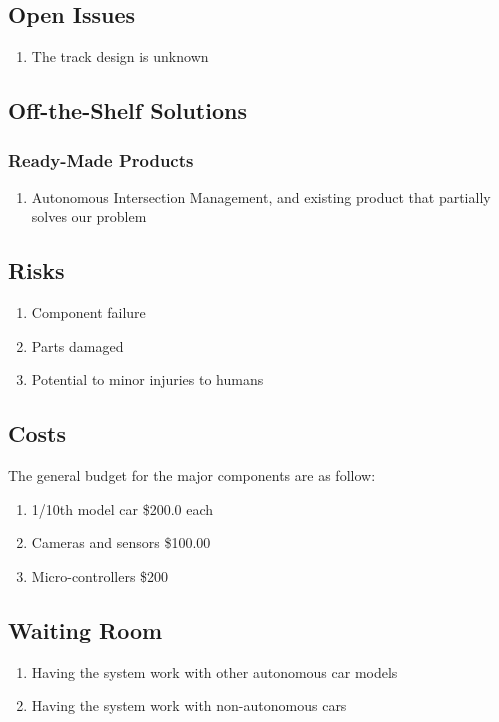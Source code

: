 \documentclass [12pt]{article}
\begin{document}
\subsection{Open Issues}
	\begin{enumerate}[label=\textbf{\Alph*}:]
		\item The track design is unknown
	\end{enumerate}

\subsection{Off-the-Shelf Solutions}

\subsubsection{Ready-Made Products}
	\begin{enumerate}[label=\textbf{\Alph*}:]
		\item Autonomous Intersection Management, and existing product that partially solves our problem
	\end{enumerate}


\subsection{Risks}
	\begin{enumerate}[label=\textbf{\Alph*}:]
		\item Component failure
		\item Parts damaged
		\item Potential to minor injuries to humans
	\end{enumerate}
	
\subsection{Costs}	
		
		The general budget for the major components are as follow:

		\begin{enumerate}[label=\textbf{\Alph*}:]
			\item 1/10th model car \$200.0 each
			\item Cameras and sensors \$100.00
			\item Micro-controllers \$200  
		\end{enumerate}


\subsection{Waiting Room}
	\begin{enumerate}[label=\textbf{\Alph*}:]
		\item Having the system work with other autonomous car models
		\item Having the system work with non-autonomous cars
	\end{enumerate} 
\end{document}
